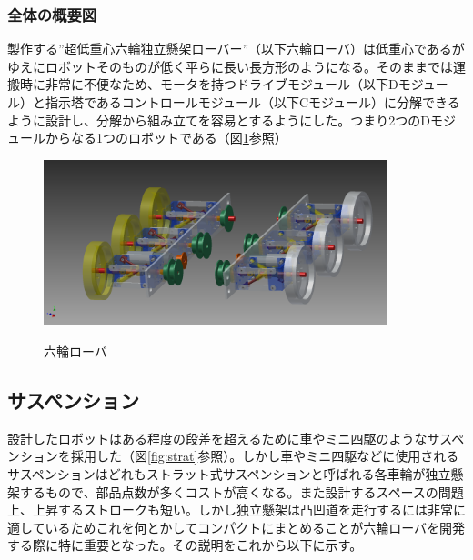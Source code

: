 \documentclass[11pt]{jsarticle}
\begin{document}
\subsubsection{全体の概要図}
製作する”超低重心六輪独立懸架ローバー”（以下六輪ローバ）は低重心であるがゆえにロボットそのものが低く平らに長い長方形のようになる。そのままでは運搬時に非常に不便なため、モータを持つドライブモジュール（以下Dモジュール）と指示塔であるコントロールモジュール（以下Cモジュール）に分解できるように設計し、分解から組み立てを容易とするようにした。つまり2つのDモジュールからなる1つのロボットである（図\ref{fig:rokurin}参照）

\begin{figure}[htbt]
 \begin{center}
  \includegraphics[width=100mm]{int.png}
 　\caption{六輪ローバ}
  \label{fig:rokurin}%
 \end{center}
\end{figure}
\subsection{サスペンション}

設計したロボットはある程度の段差を超えるために車やミニ四駆のようなサスペンションを採用した（図\ref{fig:strat}参照）。しかし車やミニ四駆などに使用されるサスペンションはどれもストラット式サスペンションと呼ばれる各車輪が独立懸架するもので、部品点数が多くコストが高くなる。また設計するスペースの問題上、上昇するストロークも短い。しかし独立懸架は凸凹道を走行するには非常に適しているためこれを何とかしてコンパクトにまとめることが六輪ローバを開発する際に特に重要となった。その説明をこれから以下に示す。
\end{document}
